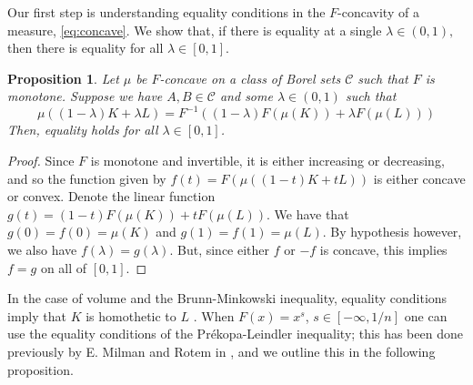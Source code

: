 \documentclass[11pt]{amsart}
\newtheorem{proposition}[theorem]{Proposition}
\theoremstyle{definition}
\theoremstyle{remark}
\numberwithin{equation}{section}
\begin{document}
	Our first step is understanding equality conditions in the $F$-concavity of a measure, \eqref{eq:concave}. We show that, if there is equality at a single $\lambda\in (0,1),$ then there is equality for all $\lambda\in [0,1].$
	\begin{proposition}
	\label{p:equal}
	Let $\mu$ be $F$-concave on a class of Borel sets $\mathcal{C}$ such that $F$ is monotone. Suppose we have $A,B\in\mathcal{C}$ and some $\lambda\in(0,1)$ such that
	\begin{equation*}
	\mu\left((1-\lambda)K+\lambda L\right) = F^{-1}\left((1-\lambda) F(\mu(K)) +\lambda F(\mu(L))\right)
	\end{equation*}
	Then, equality holds for all $\lambda \in [0,1]$.
	\end{proposition}
	\begin{proof}
	Since $F$ is monotone and invertible, it is either increasing or decreasing, and so the function given by $f(t)=F\left(\mu\left((1-t)K+t L\right)\right)$
	is either concave or convex. Denote the linear function $g(t)=(1-t) F(\mu(K)) +t F(\mu(L))$. We have that $g(0)=f(0)=\mu(K)$ and $g(1)=f(1)=\mu(L)$. By hypothesis however, we also have $f(\lambda)=g(\lambda)$. But, since either $f$ or $-f$ is concave, this implies $f=g$ on all of $[0,1].$
	\end{proof}
	
	In the case of volume and the Brunn-Minkowski inequality, equality conditions imply that $K$ is homothetic to $L$ \cite[Chapter 7]{Sh1}. When $F(x)=x^s$, $s\in[-\infty,1/n]$ one can use the equality conditions of the Pr{\'e}kopa-Leindler inequality; this has been done previously by E. Milman and Rotem in \cite{MR14}, and we outline this in the following proposition.
	
\end{document}
